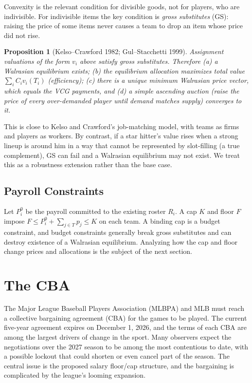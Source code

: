 \documentclass{article}
\newtheorem{proposition}{Proposition}
\begin{document}
\noindent Convexity is the relevant condition for divisible goods, not for players, who are indivisible. For indivisible items the key condition is \emph{gross substitutes} (GS): raising the price of some items never causes a team to drop an item whose price did not rise.

\begin{proposition}[Kelso--Crawford 1982; Gul--Stacchetti 1999]
Assignment valuations of the form $v_i$ above satisfy gross substitutes. Therefore (a) a Walrasian equilibrium exists; (b) the equilibrium allocation maximizes total value $\sum_i C_i v_i(T_i)$ (efficiency); (c) there is a unique minimum Walrasian price vector, which equals the VCG payments, and (d) a simple ascending auction (raise the price of every over-demanded player until demand matches supply) converges to it.
\end{proposition}

\noindent This is close to Kelso and Crawford's job-matching model, with teams as firms and players as workers. By contrast, if a star hitter's value rises when a strong lineup is around him in a way that cannot be represented by slot-filling (a true complement), GS can fail and a Walrasian equilibrium may not exist. We treat this as a robustness extension rather than the base case. 

\subsection{Payroll Constraints}
Let $P_i^0$ be the payroll committed to the existing roster $R_i$. A cap $K$ and floor $F$ impose $F \le P_i^0 + \sum_{j\in T} p_j \le K$ on each team. A binding cap is a budget constraint, and budget constraints generally break gross substitutes and can destroy existence of a Walrasian equilibrium. Analyzing how the cap and floor change prices and allocations is the subject of the next section.

\section{The CBA}
The Major League Baseball Players Association (MLBPA) and MLB must reach a collective bargaining agreement (CBA) for the games to be played. The current five-year agreement expires on December 1, 2026, and the terms of each CBA are among the largest drivers of change in the sport. Many observers expect the negotiations over the 2027 season to be among the most contentious to date, with a possible lockout that could shorten or even cancel part of the season. %
The central issue is the proposed salary floor/cap structure, and the bargaining is complicated by the league's looming expansion. %
\end{document}
